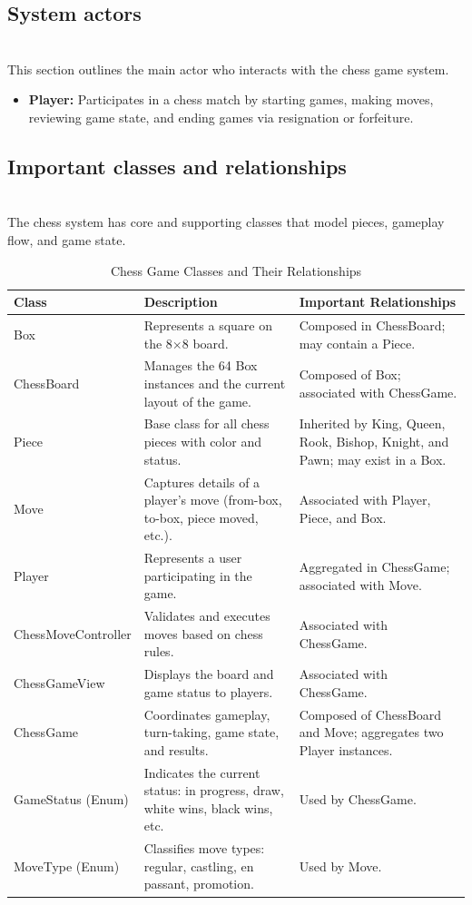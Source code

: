 \subsection{System actors}\label{cAeiMdLocRi3LKGzIXYIs}
\\
This section outlines the main actor who interacts with the chess game system.

\begin{itemize}
\item
\protect{}\label{qYQmjXV9rhY3EBykkIzOd}
\textbf{Player:} Participates in a chess match by starting games, making moves, reviewing game state, and ending games via resignation or forfeiture.
\end{itemize}

\subsection{Important classes and relationships}\label{dNN2Gdah9TBxCsz-wdNfS}
\\
The chess system has core and supporting classes that model pieces, gameplay flow, and game state.

\begin{table}[h!]
\centering
\begin{tabular}{|p{3.5cm}|p{6.5cm}|p{6cm}|}
\hline
\textbf{Class} & \textbf{Description} & \textbf{Important Relationships} \\
\hline
Box & Represents a square on the 8$\times$8 board. & Composed in ChessBoard; may contain a Piece. \\
\hline
ChessBoard & Manages the 64 Box instances and the current layout of the game. & Composed of Box; associated with ChessGame. \\
\hline
Piece & Base class for all chess pieces with color and status. & Inherited by King, Queen, Rook, Bishop, Knight, and Pawn; may exist in a Box. \\
\hline
Move & Captures details of a player’s move (from-box, to-box, piece moved, etc.). & Associated with Player, Piece, and Box. \\
\hline
Player & Represents a user participating in the game. & Aggregated in ChessGame; associated with Move. \\
\hline
ChessMoveController & Validates and executes moves based on chess rules. & Associated with ChessGame. \\
\hline
ChessGameView & Displays the board and game status to players. & Associated with ChessGame. \\
\hline
ChessGame & Coordinates gameplay, turn-taking, game state, and results. & Composed of ChessBoard and Move; aggregates two Player instances. \\
\hline
GameStatus (Enum) & Indicates the current status: in progress, draw, white wins, black wins, etc. & Used by ChessGame. \\
\hline
MoveType (Enum) & Classifies move types: regular, castling, en passant, promotion. & Used by Move. \\
\hline
\end{tabular}
\caption{Chess Game Classes and Their Relationships}
\label{tab:chess_classes}
\end{table}



